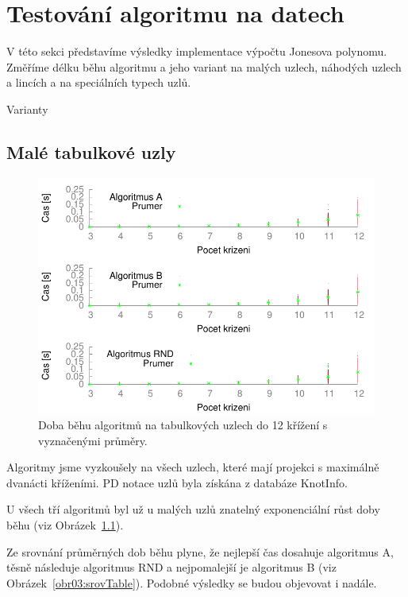 
\chapter{Testování algoritmu na datech}

V této sekci představíme výsledky implementace výpočtu Jonesova polynomu. Změříme délku běhu algoritmu a jeho variant na malých uzlech, náhodých uzlech a lincích a na speciálních typech uzlů.

Varianty

\section{Malé tabulkové uzly}



\begin{figure}[p]\centering
\includegraphics{../img/multiTable}
\caption{Doba běhu algoritmů na tabulkových uzlech do 12 křížení s vyznačenými průměry.}
\label{obr03:multiTable}
\end{figure}

Algoritmy jsme vyzkoušely na všech uzlech, které mají projekci s maximálně dvanácti kříženími. PD notace uzlů byla získána z databáze KnotInfo. 

U všech tří algoritmů byl už u malých uzlů znatelný exponenciální růst doby běhu (viz Obrázek~\ref{obr03:multiTable}).
 

Ze srovnání průměrných dob běhu plyne, že nejlepší čas dosahuje algoritmus A, těsně následuje algoritmus RND a nejpomalejší je algoritmus B (viz Obrázek~\ref{obr03:srovTable}). Podobné výsledky se budou objevovat i nadále.
	
